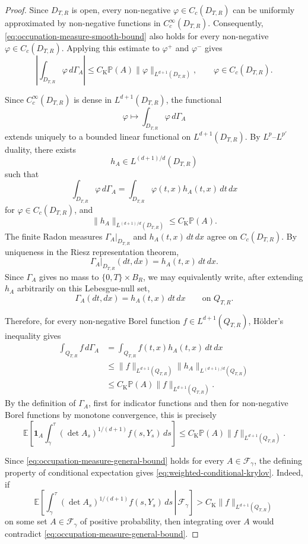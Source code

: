 \documentclass[10pt,a4paper]{amsart}
\begin{document}
\begin{proof}
	Since \(D_{T,R}\) is open, every non-negative
	\(\varphi\in C_c(D_{T,R})\) can be uniformly approximated by
	non-negative functions in \(C_c^\infty(D_{T,R})\).
	Consequently, \eqref{eq:occupation-measure-smooth-bound} also holds
	for every non-negative \(\varphi\in C_c(D_{T,R})\).
	Applying this estimate to \(\varphi^+\) and \(\varphi^-\) gives
	\[
	\left|
	\int_{D_{T,R}}\varphi\,d\Gamma_A
	\right|
	\leq
	C_{\mathrm K}\mathbb P(A)
	\|\varphi\|_{L^{d+1}(D_{T,R})},
	\qquad
	\varphi\in C_c(D_{T,R}).
	\]
	
	Since \(C_c^\infty(D_{T,R})\) is dense in
	\(L^{d+1}(D_{T,R})\), the functional
	\[
	\varphi
	\longmapsto
	\int_{D_{T,R}}\varphi\,d\Gamma_A
	\]
	extends uniquely to a bounded linear functional on
	\(L^{d+1}(D_{T,R})\). By
	\(L^p\)--\(L^{p'}\) duality, there exists
	\[
	h_A
	\in
	L^{(d+1)/d}(D_{T,R})
	\]
	such that
	\[
	\int_{D_{T,R}}\varphi\,d\Gamma_A
	=
	\int_{D_{T,R}}
	\varphi(t,x)h_A(t,x)\,dt\,dx
	\]
	for \(\varphi\in C_c(D_{T,R})\), and
	\[
	\|h_A\|_{L^{(d+1)/d}(D_{T,R})}
	\leq
	C_{\mathrm K}\mathbb P(A).
	\]
	The finite Radon measures
	\(\Gamma_A|_{D_{T,R}}\) and
	\(h_A(t,x)\,dt\,dx\) agree on \(C_c(D_{T,R})\).
	By uniqueness in the Riesz representation theorem,
	\[
	\Gamma_A|_{D_{T,R}}(dt,dx)
	=
	h_A(t,x)\,dt\,dx.
	\]
	Since \(\Gamma_A\) gives no mass to
	\(\{0,T\}\times B_R\), we may equivalently write, after extending
	\(h_A\) arbitrarily on this Lebesgue-null set,
	\begin{equation}
		\label{eq:occupation-density}
		\Gamma_A(dt,dx)
		=
		h_A(t,x)\,dt\,dx
		\qquad\text{on }Q_{T,R}.
	\end{equation}
	
	Therefore, for every non-negative Borel function
	\(f\in L^{d+1}(Q_{T,R})\), H\"older's inequality gives
	\[
	\begin{aligned}
		\int_{Q_{T,R}}f\,d\Gamma_A
		&=
		\int_{Q_{T,R}}
		f(t,x)h_A(t,x)\,dt\,dx
		\\
		&\leq
		\|f\|_{L^{d+1}(Q_{T,R})}
		\|h_A\|_{L^{(d+1)/d}(Q_{T,R})}
		\\
		&\leq
		C_{\mathrm K}\mathbb P(A)
		\|f\|_{L^{d+1}(Q_{T,R})}.
	\end{aligned}
	\]
	By the definition of \(\Gamma_A\), first for indicator functions
	and then for non-negative Borel functions by monotone convergence,
	this is precisely
	\begin{equation}
		\label{eq:occupation-measure-general-bound}
		\mathbb E\left[
		\mathbf1_A
		\int_\gamma^\tau
		(\det A_s)^{1/(d+1)}
		f(s,Y_s)\,ds
		\right]
		\leq
		C_{\mathrm K}\mathbb P(A)
		\|f\|_{L^{d+1}(Q_{T,R})}.
	\end{equation}
	
	Since \eqref{eq:occupation-measure-general-bound} holds for every
	\(A\in\mathcal F_\gamma\), the defining property of conditional
	expectation gives
	\eqref{eq:weighted-conditional-krylov}. Indeed, if
	\[
	\mathbb E\left[
	\left.
	\int_\gamma^\tau
	(\det A_s)^{1/(d+1)}
	f(s,Y_s)\,ds
	\,\right|\,
	\mathcal F_\gamma
	\right]
	>
	C_{\mathrm K}
	\|f\|_{L^{d+1}(Q_{T,R})}
	\]
	on some set \(A\in\mathcal F_\gamma\) of positive probability, then
	integrating over \(A\) would contradict
	\eqref{eq:occupation-measure-general-bound}.
\end{proof}
\end{document}
